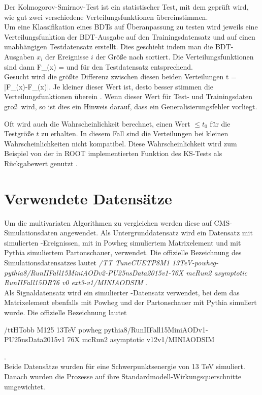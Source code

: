 Der Kolmogorov-Smirnov-Test ist ein statistischer Test, mit dem gepr\"uft wird, wie gut zwei verschiedene Verteilungsfunktionen \"ubereinstimmen.\\
Um eine Klassifikation eines BDTs auf \"Uberanpassung zu testen wird jeweils eine Verteilungsfunktion der BDT-Ausgabe auf den Trainingsdatensatz und auf einen unabh\"angigen Testdatensatz erstellt. Dies geschieht indem man die BDT-Ausgaben $x_i$ der Ereignisse $i$ der Gr\"o\ss e nach sortiert. Die Verteilungsfunktionen sind dann
\beq
F_{}(x) = 
\label{eq:CDF_train}
\eeq
und f\"ur den Testdatensatz entsprechend.\\
Gesucht wird die gr\"o\ss te Differenz zwischen diesen beiden Verteilungen
\beq
t = \cdot\max\left|F_{}(x)-F_{}(x)\right|.
\label{eq:KSTest}
\eeq
Je kleiner dieser Wert ist, desto besser stimmen die Verteilungsfunktionen \"uberein \cite{Blobel}. Wenn dieser Wert f\"ur Test- und Trainingsdaten gro\ss~wird, so ist dies ein Hinweis darauf, dass ein Generalisierungsfehler vorliegt.

Oft wird auch die Wahrscheinlichkeit berechnet, einen Wert $\leq t_0$ f\"ur die Testgr\"o\ss e $t$ zu erhalten. In diesem Fall sind die Verteilungen bei kleinen Wahrscheinlichkeiten nicht kompatibel. Diese Wahrscheinlichkeit wird zum Beispiel von der in ROOT implementierten Funktion des KS-Tests als R\"uckgabewert genutzt \cite{ROOT:TH1F}.

\section{Verwendete Datens\"atze}
\label{ch:Vergleich:sec:Daten}

Um die multivariaten Algorithmen zu vergleichen werden diese auf CMS-Simulationsdaten angewendet. Als Untergrunddatensatz wird ein Datensatz mit simulierten \ttb-Ereignissen, mit in Powheg \cite{Frixione:2007vw} simuliertem Matrixelement und mit Pythia \cite{Sjostrand2015159} simuliertem Partonschauer, verwendet. Die offizielle Bezeichnung des Simulationsdatensatzes lautet {\it/TT TuneCUETP8M1 13TeV-powheg-pythia8/RunIIFall15MiniAODv2-PU25nsData2015v1-76X mcRun2 asymptotic RunIIFall15DR76 v0 ext3-v1/MINIAODSIM }.\\
Als Signaldatensatz wird ein simulierter \ttH-Datensatz verwendet, bei dem das Matrixelement ebenfalls mit Powheg und der Partonschauer mit Pythia simuliert wurde. Die offizielle Bezeichnung lautet \begin{it}/ttHTobb M125 13TeV powheg pythia8/RunIIFall15MiniAODv1-PU25nsData2015v1 76X mcRun2 asymptotic v12v1/MINIAODSIM\end{it}.\\
Beide Datens\"atze wurden f\"ur eine Schwerpunktsenergie von \num{13} \si{\tera\electronvolt} simuliert. Danach wurden die Prozesse auf ihre Standardmodell-Wirkungsquerschnitte umgewichtet.

